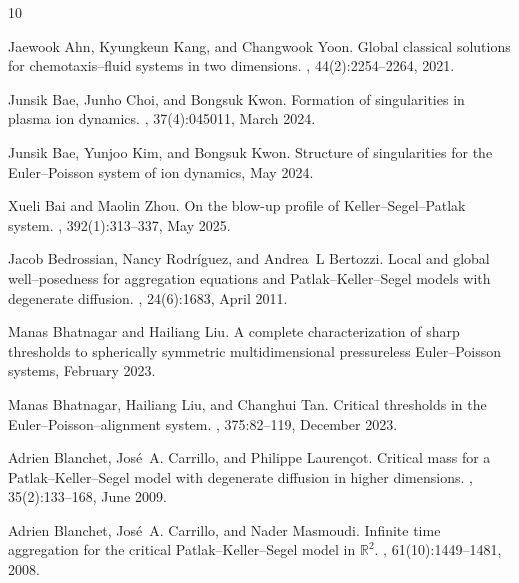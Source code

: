 \documentclass[11pt]{article}
\theoremstyle{plain}
\theoremstyle{definition}
\theoremstyle{remark}
\numberwithin{equation}{section}
\begin{document}
\begin{thebibliography}{10}

Jaewook Ahn, Kyungkeun Kang, and Changwook Yoon.
\newblock Global classical solutions for chemotaxis--fluid systems in two dimensions.
, 44(2):2254--2264, 2021.

Junsik Bae, Junho Choi, and Bongsuk Kwon.
\newblock Formation of singularities in plasma ion dynamics.
, 37(4):045011, March 2024.

Junsik Bae, Yunjoo Kim, and Bongsuk Kwon.
\newblock Structure of singularities for the Euler--Poisson system of ion dynamics, May 2024.

Xueli Bai and Maolin Zhou.
\newblock On the blow-up profile of Keller--Segel--Patlak system.
, 392(1):313--337, May 2025.

Jacob Bedrossian, Nancy Rodríguez, and Andrea~L Bertozzi.
\newblock Local and global well--posedness for aggregation equations and Patlak--Keller--Segel models with degenerate diffusion.
, 24(6):1683, April 2011.

Manas Bhatnagar and Hailiang Liu.
\newblock A complete characterization of sharp thresholds to spherically symmetric multidimensional pressureless Euler--Poisson systems, February 2023.

Manas Bhatnagar, Hailiang Liu, and Changhui Tan.
\newblock Critical thresholds in the Euler--Poisson--alignment system.
, 375:82--119, December 2023.

Adrien Blanchet, José~A. Carrillo, and Philippe Laurençot.
\newblock Critical mass for a Patlak--Keller--Segel model with degenerate diffusion in higher dimensions.
, 35(2):133--168, June 2009.

Adrien Blanchet, José~A. Carrillo, and Nader Masmoudi.
\newblock Infinite time aggregation for the critical Patlak--Keller--Segel model in $\mathbb R^2$.
, 61(10):1449--1481, 2008.


\end{thebibliography}
\end{document}
